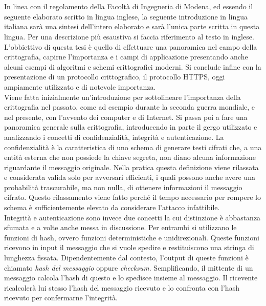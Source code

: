 \chapter*{}
In linea con il regolamento della Facoltà di Ingegneria di Modena, ed essendo il seguente elaborato scritto in lingua inglese, la seguente introduzione in lingua italiana sarà una sintesi dell'intero elaborato e sarà l'unica parte scritta in questa lingua. Per una descrizione più esaustiva si faccia riferimento al testo in inglese.\\
L'obbiettivo di questa tesi è quello di effettuare una panoramica nel campo della crittografia, capirne l'importanza e i campi di applicazione presentando anche alcuni esempi di algoritmi e schemi crittografici moderni. Si conclude infine con la presentazione di un protocollo crittografico, il protocollo HTTPS, oggi ampiamente utilizzato e di notevole importanza.
\\
Viene fatta inizialmente un'introduzione per sottolineare l'importanza della crittografia nel passato, come ad esempio durante la seconda guerra mondiale, e nel presente, con l'avvento dei computer e di Internet. Si passa poi a fare una panoramica generale sulla crittografia, introducendo in parte il gergo utilizzato e analizzando i concetti di confidenzialità, integrità e autenticazione. La confidenzialità è la caratteristica di uno schema di generare testi cifrati che, a una entità esterna che non possiede la chiave segreta, non diano alcuna informazione riguardante il messaggio originale. Nella pratica questa definizione viene rilassata e considerata valida solo per avversari efficienti, i quali possono anche avere una probabilità trascurabile, ma non nulla, di ottenere informazioni il messaggio cifrato. Questo rilassamento viene fatto perché il tempo necessario per rompere lo schema è sufficientemente elevato da considerare l'attacco infattibile.\\
 Integrità e autenticazione sono invece due concetti la cui distinzione è abbastanza sfumata e a volte anche messa in discussione. Per entrambi si utilizzano le funzioni di hash, ovvero funzioni deterministiche e unidirezionali. Queste funzioni ricevono in input il messaggio che si vuole spedire e restituiscono una stringa di lunghezza fissata. Dipendentemente dal contesto, l'output di queste funzioni è chiamato \emph{hash del messaggio} oppure \emph{checksum}. Semplificando, il mittente di un messaggio calcola l'hash di questo e lo spedisce insieme al messaggio. Il ricevente ricalcolerà lui stesso l'hash del messaggio ricevuto e lo confronta con l'hash ricevuto per confermarne l'integrità.
